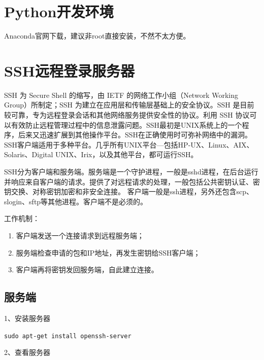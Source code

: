 \section{Python开发环境}
Anaconda官网下载，建议非root直接安装，不然不太方便。


\section{SSH远程登录服务器}
SSH 为 Secure Shell 的缩写，由 IETF 的网络工作小组（Network Working Group）所制定；SSH 为建立在应用层和传输层基础上的安全协议。SSH 是目前较可靠，专为远程登录会话和其他网络服务提供安全性的协议。利用 SSH 协议可以有效防止远程管理过程中的信息泄露问题。SSH最初是UNIX系统上的一个程序，后来又迅速扩展到其他操作平台。SSH在正确使用时可弥补网络中的漏洞。SSH客户端适用于多种平台。几乎所有UNIX平台—包括HP-UX、Linux、AIX、Solaris、Digital UNIX、Irix，以及其他平台，都可运行SSH。

SSH分为客户端和服务端。服务端是一个守护进程，一般是sshd进程，在后台运行并响应来自客户端的请求。提供了对远程请求的处理，一般包括公共密钥认证、密钥交换、对称密钥加密和非安全连接。
客户端一般是ssh进程，另外还包含scp、slogin、sftp等其他进程。客户端不是必须的。

工作机制：
\begin{enumerate}
\item 客户端发送一个连接请求到远程服务端；
\item 服务端检查申请的包和IP地址，再发生密钥给SSH客户端；
\item 客户端再将密钥发回服务端，自此建立连接。
\end{enumerate}


\subsection{服务端}
1、安装服务器

\verb|sudo apt-get install openssh-server|

2、查看服务器

